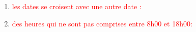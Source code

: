 \documentclass{article}
\begin{document}
\begin{enumerate}
\begin{enumerate}
               \noindent{}
  \item \textcolor{red}{les dates se croisent avec une autre date :} 
  \vspace{0.7cm}
               \hspace*{-0.7in}

               \noindent{}
               
          \item \textcolor{red}{des heures qui ne sont pas comprises entre 8h00 et 18h00:}     
 \vspace{0.7cm}
               \hspace*{-0.7in}


\end{enumerate}
\end{enumerate}
\end{document}
